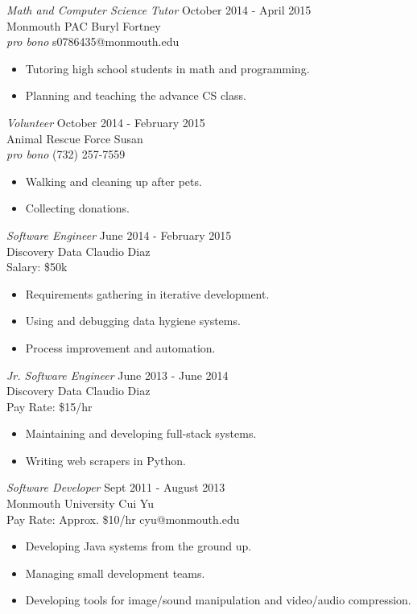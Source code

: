 \documentclass[margin]{res}
\begin{document}
\begin{resume}
	{\sl Math and Computer Science Tutor} \hfill October 2014 - April 2015\\
	Monmouth PAC \hfill Buryl Fortney\\
	{\sl pro bono} \hfill s0786435@monmouth.edu
	\begin{itemize}  \itemsep -2pt
		\item Tutoring high school students in math and programming.
		\item Planning and teaching the advance CS class.
	\end{itemize}

	{\sl Volunteer} \hfill October 2014 - February 2015\\
	Animal Rescue Force \hfill Susan\\
	{\sl pro bono} \hfill (732) 257-7559
	\begin{itemize}  \itemsep -2pt
		\item Walking and cleaning up after pets.
		\item Collecting donations.
	\end{itemize}

	{\sl Software Engineer} \hfill June 2014 - February 2015\\
	Discovery Data \hfill Claudio Diaz\\
	Salary: \$50k \hfill
	\begin{itemize}  \itemsep -2pt
		\item Requirements gathering in iterative development.
		\item Using and debugging data hygiene systems.
		\item Process improvement and automation.
	\end{itemize}
	
	{\sl Jr. Software Engineer} \hfill June 2013 - June 2014 \\
	Discovery Data \hfill Claudio Diaz\\
	Pay Rate: \$15/hr \hfill
	\begin{itemize}  \itemsep -2pt
		\item Maintaining and developing full-stack systems.
		\item Writing web scrapers in Python.
	\end{itemize}
	
	{\sl Software Developer} \hfill Sept 2011 - August 2013 \\
	Monmouth University \hfill Cui Yu\\
	Pay Rate: Approx. \$10/hr \hfill cyu@monmouth.edu
	\begin{itemize}  \itemsep -2pt
		\item Developing Java systems from the ground up.
		\item Managing small development teams.
		\item Developing tools for image/sound manipulation and video/audio compression.
	\end{itemize}
	

\end{resume}
\end{document}
